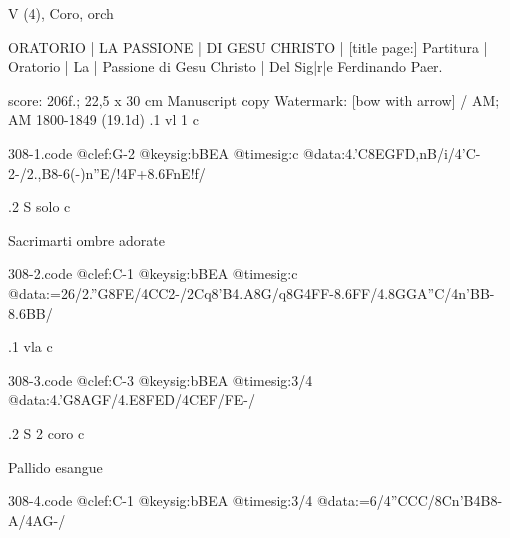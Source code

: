 \documentclass[twocolumn]{book}
\begin{document}
\newline V (4), Coro, orch
\newline \begin{itshape} ORATORIO | LA PASSIONE | DI GESU CHRISTO | [title page:] Partitura | Oratorio | La | Passione di Gesu Christo | Del Sig|r|e Ferdinando Paer.\end{itshape} 
\newline \textcolor{darkblue}{}  score: 206f.; 22,5 x 30 cm
\newline Manuscript copy
\newline Watermark: [bow with arrow] / AM; AM  1800-1849 (19.1d)
.1  vl 1  c  
\begin{filecontents*}{308-1.code}
@clef:G-2
@keysig:bBEA
@timesig:c
@data:4.'C8E{GFD,nB}/i/4'C-2-/2.,B8-6(-)n''E/!4F+{8.6FnE}!f/
\end{filecontents*}
\newline
%

.2  S solo  c
\newline \begin{footnotesize} Sacrimarti ombre adorate \end{footnotesize}  
\begin{filecontents*}{308-2.code}
@clef:C-1
@keysig:bBEA
@timesig:c
@data:=26/2.''G{8FE}/4CC2-/2Cq8'B4.A8G/q8G4FF-8.6FF/4.8GGA''C/4n'BB-8.6BB/
\end{filecontents*}
\newline
%

.1  vla  c  
\begin{filecontents*}{308-3.code}
@clef:C-3
@keysig:bBEA
@timesig:3/4
@data:4.'G{8AGF}/4.E{8FED}/4CEF/FE-/
\end{filecontents*}
\newline
%

.2  S 2 coro  c
\newline \begin{footnotesize} Pallido esangue \end{footnotesize}  
\begin{filecontents*}{308-4.code}
@clef:C-1
@keysig:bBEA
@timesig:3/4
@data:=6/4''CCC/{8Cn'B}4B8-A/4AG-/
\end{filecontents*}
\newline
%
\end{document}
